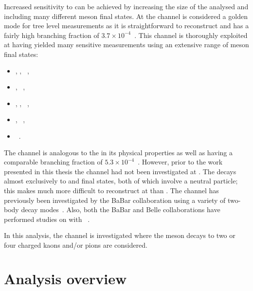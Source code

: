 Increased sensitivity to \Pgamma can be achieved by increasing the size of the \dataset analysed and including many different \D meson final states. At \lhcb the \decay{\Bm}{\D\Km} channel is considered a golden mode for tree level \Pgamma measurements as it is straightforward to reconstruct and has a fairly high branching fraction of $3.7 \times 10^{-4}$~\cite{PDG2016}. This \decay{\Bm}{\D\Km} channel is thoroughly exploited at \lhcb having yielded many \Pgamma sensitive measurements using an extensive range of \D meson final states:
\begin{itemize}
\item \decay{\D}{\Kp\pim}, \Kp\Km, \pip\pim~\cite{LHCb-PAPER-2017-021},
\item \decay{\D}{\Kp\pim\pip\pim}, \pip\pim\pip\pim~\cite{LHCb-PAPER-2016-003},
\item \decay{\D}{\Kp\pim\piz}, \Kp\Km\piz, \pip\pim\piz~\cite{LHCb-PAPER-2015-014},
\item \decay{\D}{\KS\Kp\Km}, \KS\pip\pim~\cite{LHCb-PAPER-2014-041},
\item \decay{\D}{\KS\Kp\Km}~\cite{LHCb-PAPER-2013-068}.
\end{itemize}

The \decay{\Bm}{\D\Kstarm} channel is analogous to the \decay{\Bm}{\D\Km} in its physical properties as well as having a comparable branching fraction of $5.3 \times 10^{-4}$~\cite{PDG2016}. However, prior to the work presented in this thesis the \decay{\Bm}{\D\Kstarm} channel had not been investigated at \lhcb. The \Kstarm decays almost exclusively to \Kz\pim and \Km\piz final states, both of which involve a neutral particle; this makes \decay{\Bm}{\D\Kstarm} much more difficult to reconstruct at \lhcb than \decay{\Bm}{\D\Km}. The \decay{\Bm}{\D\Kstarm} channel has previously been investigated by the BaBar collaboration using a variety of two-body \D decay modes~\cite{BaBarDKstar}. Also, both the BaBar and Belle collaborations have performed studies on \decay{\Bm}{\D\Kstarm} with \decay{\D}{\KS\pip\pim}~\cite{BaBarGGSZ,BelleGGSZ}. 

In this analysis, the \decay{\Bm}{\D\Kstarm(\KS\pim)} channel is investigated where the \D meson decays to two or four charged kaons and/or pions are considered. 

\section{Analysis overview}

